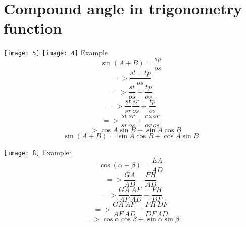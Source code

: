 \section{Compound angle in trigonometry function}
\texttt{[image: 5]}
\texttt{[image: 4]}
\newline
Example
\begin{equation}
\sin(A+B)=\frac{sp}{os}
\end{equation}
\begin{displaymath}
=>\frac{st+tp}{os}
\end{displaymath}
\begin{displaymath}
=>\frac{st}{os}+\frac{tp}{os}
\end{displaymath}
\begin{displaymath}
=>\frac{st}{sr}\frac{sr}{os}+\frac{tp}{os}
\end{displaymath}
\begin{displaymath}
=>\frac{st}{sr}\frac{sr}{os}+\frac{ra}{or}\frac{or}{os}
\end{displaymath}
\begin{displaymath}
=> \cos A\sin B+\sin A\cos B
\end{displaymath}
\begin{equation}
\sin(A+B) = \sin A\cos B+\cos A\sin B
\end{equation}

\texttt{[image: 8]}
\newline
Example:
\newline
\begin{displaymath}
\cos(\alpha+\beta) = \frac{EA}{AD}
\end{displaymath}
\begin{displaymath}
=> \frac{GA}{AD}-\frac{FH}{AD}
\end{displaymath}
\begin{displaymath}
=> \frac{GA}{AF}\frac{AF}{AD}-\frac{FH}{DF}
\end{displaymath}
\begin{displaymath}
=> \frac{GA}{AF}\frac{AF}{AD}-\frac{FH}{DF}\frac{DF}{AD}
\end{displaymath}
\begin{equation}
=> \cos\alpha \cos\beta + \sin\alpha \sin\beta
\end{equation}




